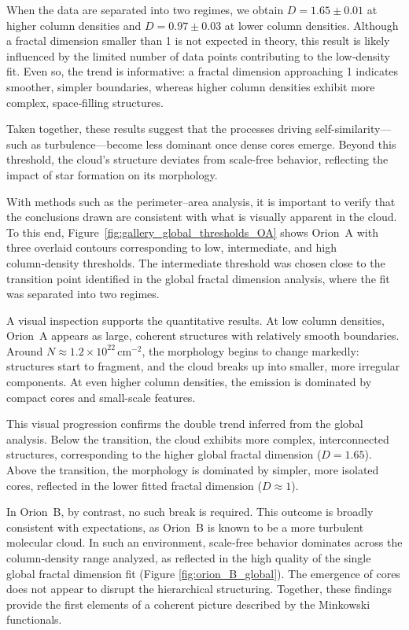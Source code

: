 When the data are separated into two regimes, we obtain \(D = 1.65 \pm 0.01\) at higher column densities and \(D = 0.97 \pm 0.03\) at lower column densities.  
Although a fractal dimension smaller than 1 is not expected in theory, this result is likely influenced by the limited number of data points contributing to the low‑density fit.  
Even so, the trend is informative: a fractal dimension approaching 1 indicates smoother, simpler boundaries, whereas higher column densities exhibit more complex, space‑filling structures.

Taken together, these results suggest that the processes driving self-similarity—such as turbulence—become less dominant once dense cores emerge.  
Beyond this threshold, the cloud’s structure deviates from scale-free behavior, reflecting the impact of star formation on its morphology.

With methods such as the perimeter–area analysis, it is important to verify that the conclusions drawn are consistent with what is visually apparent in the cloud.  
To this end, Figure~\ref{fig:gallery_global_thresholds_OA} shows Orion~A with three overlaid contours corresponding to low, intermediate, and high column‑density thresholds.  
The intermediate threshold was chosen close to the transition point identified in the global fractal dimension analysis, where the fit was separated into two regimes.

A visual inspection supports the quantitative results.  
At low column densities, Orion~A appears as large, coherent structures with relatively smooth boundaries.  
Around \(N \approx 1.2 \times 10^{22}\,\mathrm{cm}^{-2}\), the morphology begins to change markedly: structures start to fragment, and the cloud breaks up into smaller, more irregular components.  
At even higher column densities, the emission is dominated by compact cores and small-scale features.

This visual progression confirms the double trend inferred from the global analysis.  
Below the transition, the cloud exhibits more complex, interconnected structures, corresponding to the higher global fractal dimension (\(D = 1.65\)).  
Above the transition, the morphology is dominated by simpler, more isolated cores, reflected in the lower fitted fractal dimension (\(D \approx 1\)).  

In Orion~B, by contrast, no such break is required.  
This outcome is broadly consistent with expectations, as Orion~B is known to be a more turbulent molecular cloud.  
In such an environment, scale‑free behavior dominates across the column‑density range analyzed, as reflected in the high quality of the single global fractal dimension fit (Figure \ref{fig:orion_B_global}).  
The emergence of cores does not appear to disrupt the hierarchical structuring.  
Together, these findings provide the first elements of a coherent picture described by the Minkowski functionals.

